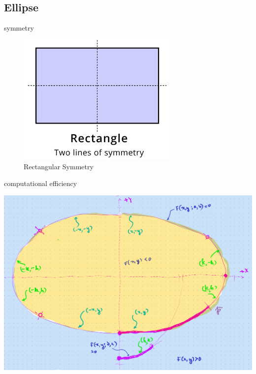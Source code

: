 \documentclass[aspectratio=169,xcolor={dvipsnames,svgnames}]{beamer}
\begin{document}
\subsection{Ellipse}
\label{sec:org9295cc9}

\begin{frame}[label={sec:orgb14800b}]{symmetry}
\begin{figure}[htbp]
\centering
\includegraphics[width=.9\linewidth]{images/rect-symmetry.png}
\caption{Rectangular Symmetry}
\end{figure}
\end{frame}

\begin{frame}[label={sec:org7874ce1}]{computational efficiency}
\begin{center}
\includegraphics[width=.9\linewidth]{images/2024-09-05-Note-15-30_annotated.png}
\end{center}
\end{frame}
\end{document}
